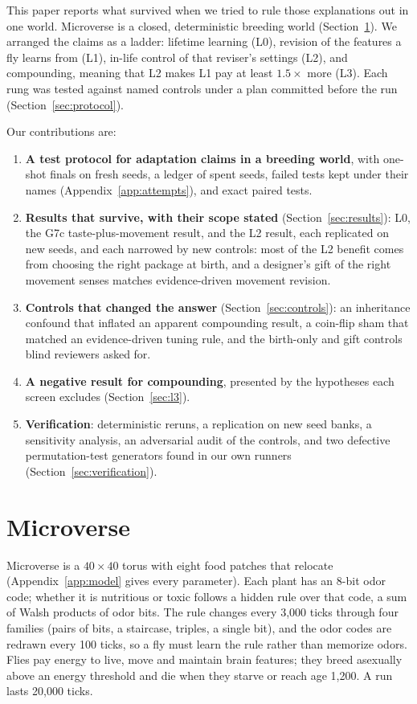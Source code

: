 \documentclass[11pt]{article}
\begin{document}
This paper reports what survived when we tried to rule those explanations out in one world. Microverse is a closed, deterministic breeding world (Section~\ref{sec:world}). We arranged the claims as a ladder: lifetime learning (L0), revision of the features a fly learns from (L1), in-life control of that reviser's settings (L2), and compounding, meaning that L2 makes L1 pay at least $1.5\times$ more (L3). Each rung was tested against named controls under a plan committed before the run (Section~\ref{sec:protocol}).

Our contributions are:
\begin{enumerate}
  \item \textbf{A test protocol for adaptation claims in a breeding world}, with one-shot finals on fresh seeds, a ledger of spent seeds, failed tests kept under their names (Appendix~\ref{app:attempts}), and exact paired tests.
  \item \textbf{Results that survive, with their scope stated} (Section~\ref{sec:results}): L0, the G7c taste-plus-movement result, and the L2 result, each replicated on new seeds, and each narrowed by new controls: most of the L2 benefit comes from choosing the right package at birth, and a designer's gift of the right movement senses matches evidence-driven movement revision.
  \item \textbf{Controls that changed the answer} (Section~\ref{sec:controls}): an inheritance confound that inflated an apparent compounding result, a coin-flip sham that matched an evidence-driven tuning rule, and the birth-only and gift controls blind reviewers asked for.
  \item \textbf{A negative result for compounding}, presented by the hypotheses each screen excludes (Section~\ref{sec:l3}).
  \item \textbf{Verification}: deterministic reruns, a replication on new seed banks, a sensitivity analysis, an adversarial audit of the controls, and two defective permutation-test generators found in our own runners (Section~\ref{sec:verification}).
\end{enumerate}

\section{Microverse}
\label{sec:world}

Microverse is a $40\times 40$ torus with eight food patches that relocate (Appendix~\ref{app:model} gives every parameter). Each plant has an 8-bit odor code; whether it is nutritious or toxic follows a hidden rule over that code, a sum of Walsh products of odor bits. The rule changes every 3,000 ticks through four families (pairs of bits, a staircase, triples, a single bit), and the odor codes are redrawn every 100 ticks, so a fly must learn the rule rather than memorize odors. Flies pay energy to live, move and maintain brain features; they breed asexually above an energy threshold and die when they starve or reach age 1,200. A run lasts 20,000 ticks.
\end{document}
